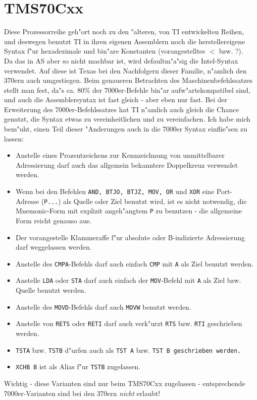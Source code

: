 \documentclass[12pt,a4paper,twoside]{report}
\newcommand{\tty}[1]{{\tt #1}}
\begin{document}

\section{TMS70Cxx}

Diese Prozessorreihe geh"ort noch zu den "alteren, von TI entwickelten
Reihen, und deswegen benutzt TI in ihren eigenen Assemblern noch die
herstellereigene Syntax f"ur hexadezimale und bin"are Konstanten
(vorangestelltes $<$ bzw. ?).  Da das in AS aber so nicht machbar ist, wird
defaultm"a"sig die Intel-Syntax verwendet.  Auf diese ist Texas bei den
Nachfolgern dieser Familie, n"amlich den 370ern auch umgestiegen.  Beim
genaueren Betrachten des Maschinenbefehlssatzes stellt man fest, da"s
ca. 80\% der 7000er-Befehle bin"ar aufw"artskompatibel sind, und auch die
Assemblersyntax ist fast gleich - aber eben nur fast.  Bei der Erweiterung
des 7000er-Befehlssatzes hat TI n"amlich auch gleich die Chance genutzt,
die Syntax etwas zu vereinheitlichen und zu vereinfachen.  Ich habe mich
bem"uht, einen Teil dieser "Anderungen auch in die 7000er Syntax
einflie"sen zu lassen:
\begin{itemize}
\item{Anstelle eines Prozentzeichens zur Kennzeichnung von
      unmittelbarer Adressierung darf auch das allgemein bekanntere Doppelkreuz
      verwendet werden.}
\item{Wenn bei den Befehlen \tty{AND, BTJO, BTJZ, MOV, OR} und
      \tty{XOR} eine Port-Adresse (\tty{P...}) als Quelle oder Ziel
      benutzt wird, ist es nicht notwendig, die Mnemonic-Form mit explizit
      angeh"angtem \tty{P} zu benutzen - die allgemeine Form reicht genauso
      aus.}
\item{Der vorangestelle Klammeraffe f"ur absolute oder B-indizierte
      Adressierung darf weggelassen werden.}
\item{Anstelle des \tty{CMPA}-Befehls darf auch einfach
      \tty{CMP} mit \tty{A} als Ziel benutzt werden.}
\item{Anstelle \tty{LDA} oder \tty{STA} darf auch einfach der \tty{MOV}-Befehl
      mit \tty{A} als Ziel bzw. Quelle benutzt werden.}
\item{Anstelle des \tty{MOVD}-Befehls darf auch \tty{MOVW} benutzt werden.}
\item{Anstelle von \tty{RETS} oder \tty{RETI} darf auch verk"urzt
      \tty{RTS} bzw. \tty{RTI} geschrieben werden.}
\item{\tty{TSTA} bzw. \tty{TSTB} d"urfen auch als \tty{TST A} bzw. \tt{TST
      B} geschrieben werden.}
\item{\tty{XCHB B} ist als Alias f"ur \tty{TSTB} zugelassen.}
\end{itemize}
Wichtig - diese Varianten sind nur beim TMS70Cxx zugelassen - entsprechende
7000er-Varianten sind bei den 370ern {\em nicht} erlaubt!
\end{document}
